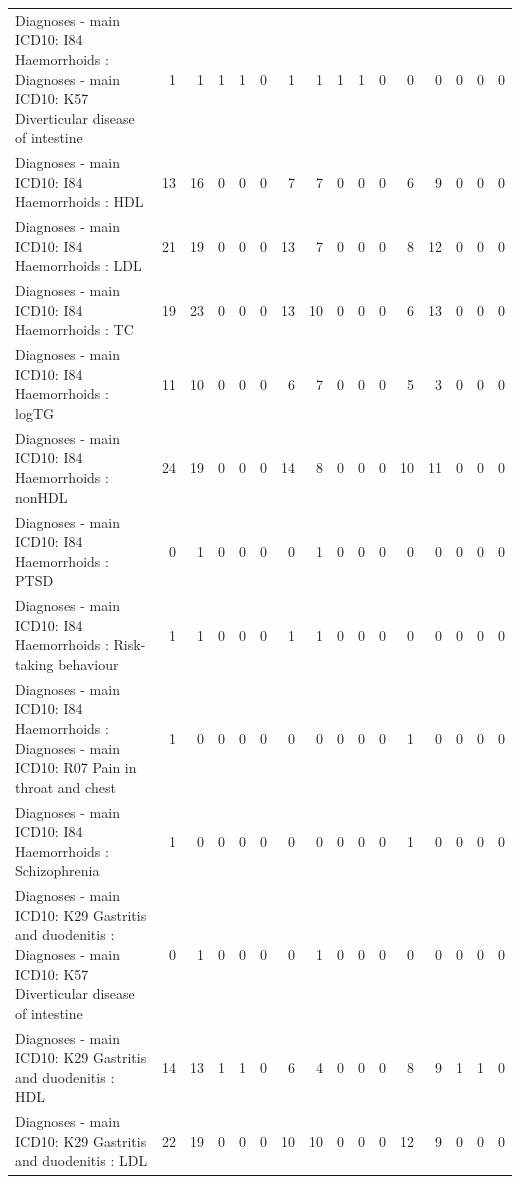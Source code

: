 \begin{table}[ht]
\begin{tabular}{lrrrrrrrrrrrrrrr}
  Diagnoses - main ICD10: I84 Haemorrhoids : Diagnoses - main ICD10: K57 Diverticular disease of intestine &   1 &   1 &   1 &   1 &   0 &   1 &   1 &   1 &   1 &   0 &   0 &   0 &   0 &   0 &   0 \\ 
  Diagnoses - main ICD10: I84 Haemorrhoids : HDL &  13 &  16 &   0 &   0 &   0 &   7 &   7 &   0 &   0 &   0 &   6 &   9 &   0 &   0 &   0 \\ 
  Diagnoses - main ICD10: I84 Haemorrhoids : LDL &  21 &  19 &   0 &   0 &   0 &  13 &   7 &   0 &   0 &   0 &   8 &  12 &   0 &   0 &   0 \\ 
  Diagnoses - main ICD10: I84 Haemorrhoids : TC &  19 &  23 &   0 &   0 &   0 &  13 &  10 &   0 &   0 &   0 &   6 &  13 &   0 &   0 &   0 \\ 
  Diagnoses - main ICD10: I84 Haemorrhoids : logTG &  11 &  10 &   0 &   0 &   0 &   6 &   7 &   0 &   0 &   0 &   5 &   3 &   0 &   0 &   0 \\ 
  Diagnoses - main ICD10: I84 Haemorrhoids : nonHDL &  24 &  19 &   0 &   0 &   0 &  14 &   8 &   0 &   0 &   0 &  10 &  11 &   0 &   0 &   0 \\ 
  Diagnoses - main ICD10: I84 Haemorrhoids : PTSD &   0 &   1 &   0 &   0 &   0 &   0 &   1 &   0 &   0 &   0 &   0 &   0 &   0 &   0 &   0 \\ 
  Diagnoses - main ICD10: I84 Haemorrhoids : Risk-taking behaviour &   1 &   1 &   0 &   0 &   0 &   1 &   1 &   0 &   0 &   0 &   0 &   0 &   0 &   0 &   0 \\ 
  Diagnoses - main ICD10: I84 Haemorrhoids : Diagnoses - main ICD10: R07 Pain in throat and chest &   1 &   0 &   0 &   0 &   0 &   0 &   0 &   0 &   0 &   0 &   1 &   0 &   0 &   0 &   0 \\ 
  Diagnoses - main ICD10: I84 Haemorrhoids : Schizophrenia &   1 &   0 &   0 &   0 &   0 &   0 &   0 &   0 &   0 &   0 &   1 &   0 &   0 &   0 &   0 \\ 
  Diagnoses - main ICD10: K29 Gastritis and duodenitis : Diagnoses - main ICD10: K57 Diverticular disease of intestine &   0 &   1 &   0 &   0 &   0 &   0 &   1 &   0 &   0 &   0 &   0 &   0 &   0 &   0 &   0 \\ 
  Diagnoses - main ICD10: K29 Gastritis and duodenitis : HDL &  14 &  13 &   1 &   1 &   0 &   6 &   4 &   0 &   0 &   0 &   8 &   9 &   1 &   1 &   0 \\ 
  Diagnoses - main ICD10: K29 Gastritis and duodenitis : LDL &  22 &  19 &   0 &   0 &   0 &  10 &  10 &   0 &   0 &   0 &  12 &   9 &   0 &   0 &   0 \\ 

\end{tabular}
\end{table}
